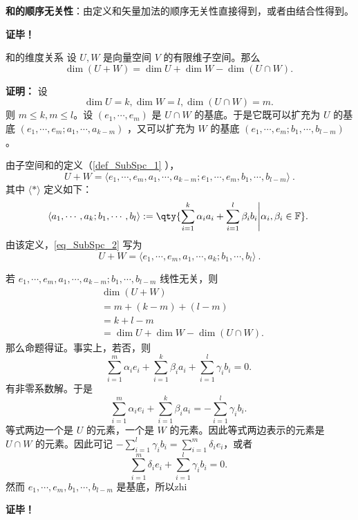 \textbf{和的顺序无关性}：由定义和矢量加法的顺序无关性直接得到，或者由结合性得到。

\textbf{证毕！}



\begin{theorem}{和的维度关系}
设 $U,W$ 是向量空间 $V$ 的有限维子空间。那么
\begin{equation}
\dim (U+W)=\dim U+\dim W-\dim(U\cap W).~
\end{equation}

\end{theorem}

\textbf{证明：}
设
\begin{equation}
\dim U=k,\dim W=l,\dim(U\cap W)=m.~
\end{equation}
则 $m\leq k,m\leq l$。设 $(e_1,\cdots,e_m)$ 是 $U\cap W$ 的基底。于是它既可以扩充为 $U$ 的基底 $(e_1,\cdots,e_m;a_1,\cdots,a_{k-m})$ ，又可以扩充为 $W$ 的基底 $(e_1,\cdots,e_m;b_1,\cdots,b_{l-m})$。

由子空间和的定义（\autoref{def_SubSpc_1} ），
\begin{equation}\label{eq_SubSpc_2}
U+W=\langle e_1,\cdots,e_m,a_1,\cdots,a_{k-m};e_1,\cdots,e_m,b_1,\cdots,b_{l-m}\rangle~.
\end{equation}
其中 $\langle*\rangle$ 定义如下：
\begin{equation}
\langle a_1,\cdots,a_k;b_1,\cdots,b_l\rangle:=\qty{\sum_{i=1}^k\alpha_i a_i+\sum_{i=1}^l\beta_i b_i\Bigg|\alpha_i,\beta_i\in \mathbb F}.~
\end{equation}
由该定义，\autoref{eq_SubSpc_2} 写为
\begin{equation}
U+W=\langle e_1,\cdots,e_m,a_1,\cdots,a_k;b_1,\cdots,b_l\rangle~.
\end{equation}

若 $e_1,\cdots,e_m,a_1,\cdots,a_{k-m};b_1,\cdots,b_{l-m}$ 线性无关，则
\begin{equation}
\begin{aligned}
&\dim (U+W)\\
&=m+(k-m)+(l-m)\\
&=k+l-m\\
&=\dim U+\dim W-\dim(U\cap W).
\end{aligned}~
\end{equation}
那么命题得证。事实上，若否，则
\begin{equation}
\sum_{i=1}^m\alpha_i e_i+\sum_{i=1}^k\beta_i a_i+\sum_{i=1}^l\gamma_i b_i=0.~
\end{equation}
有非零系数解。于是
\begin{equation}
\sum_{i=1}^m\alpha_i e_i+\sum_{i=1}^k\beta_i a_i=-\sum_{i=1}^l\gamma_i b_i.~
\end{equation}
等式两边一个是 $U$ 的元素，一个是 $W$ 的元素。因此等式两边表示的元素是 $U\cap W$ 的元素。因此可记 $-\sum_{i=1}^l\gamma_i b_i=\sum_{i=1}^m\delta_ie_i$，或者
\begin{equation}
\sum_{i=1}^m\delta_ie_i+\sum_{i=1}^l\gamma_i b_i=0.~
\end{equation}
然而 $e_1,\cdots,e_m,b_1,\cdots,b_{l-m}$ 是基底，所以zhi







\textbf{证毕！}



